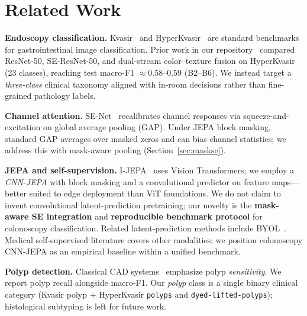 \section{Related Work}
\label{sec:related}

\textbf{Endoscopy classification.}
Kvasir~\cite{pogorelov2017kvasir} and HyperKvasir~\cite{borgli2020hyperkvasir} are standard benchmarks for gastrointestinal image classification.
Prior work in our repository~\cite{assif2026endoscopy} compared ResNet-50, SE-ResNet-50, and dual-stream color--texture fusion on HyperKvasir (23 classes), reaching test macro-F1 $\approx$0.58--0.59 (B2--B6).
We instead target a \emph{three-class} clinical taxonomy aligned with in-room decisions rather than fine-grained pathology labels.

\textbf{Channel attention.}
SE-Net~\cite{hu2018senet} recalibrates channel responses via squeeze-and-excitation on global average pooling (GAP).
Under JEPA block masking, standard GAP averages over masked zeros and can bias channel statistics; we address this with mask-aware pooling (Section~\ref{sec:maskse}).

\textbf{JEPA and self-supervision.}
I-JEPA~\cite{assran2023ijepa} uses Vision Transformers; we employ a \emph{CNN-JEPA} with block masking and a convolutional predictor on feature maps---better suited to edge deployment than ViT foundations.
We do not claim to invent convolutional latent-prediction pretraining; our novelty is the \textbf{mask-aware SE integration} and \textbf{reproducible benchmark protocol} for colonoscopy classification.
Related latent-prediction methods include BYOL~\cite{grill2020byol}.
Medical self-supervised literature covers other modalities; we position colonoscopy CNN-JEPA as an empirical baseline within a unified benchmark.

\textbf{Polyp detection.}
Classical CAD systems~\cite{tajbakhsh2016cad} emphasize polyp \emph{sensitivity}.
We report polyp recall alongside macro-F1.
Our \emph{polyp} class is a single binary clinical category (Kvasir polyp + HyperKvasir \texttt{polyps} and \texttt{dyed-lifted-polyps}); histological subtyping is left for future work.
